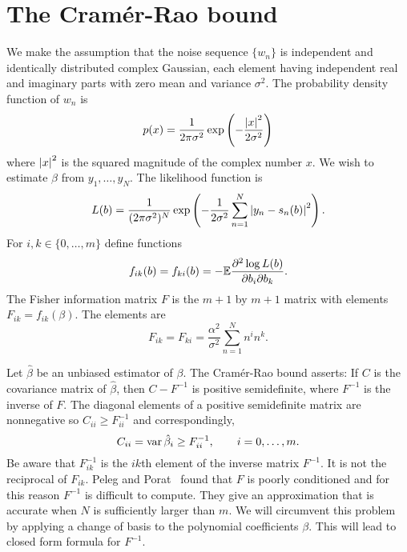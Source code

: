 \documentclass[journal,10pt]{IEEEtran}
\begin{document}
\section{The Cram\'{e}r-Rao bound} \label{sec_crb}

We make the assumption that the noise sequence $\{ w_n \}$ is independent and identically distributed complex Gaussian, each element having independent real and imaginary parts with zero mean and variance $\sigma^2$.  The probability density function of $w_n$ is 
\[
p(x) = \frac{1}{2 \pi \sigma^2} \exp\left( -\frac{{\left| x \right|}^2}{2\sigma^2} \right)
\]
where ${\left| x \right|}^2$ is the squared magnitude of the complex number $x$.  We wish to estimate $\beta$ from $y_1, \dots, y_N$.  The likelihood function is
\[
L(b) = \frac{1}{(2 \pi \sigma^2)^N} \exp\left( - \frac{1}{2\sigma^{2}} \sum_{n=1}^N {\left| y_n -  s_n(b)  \right|}^2 \right).
\]
For $i,k \in \{0, \dots, m\}$ define functions 
\[
f_{ik}(b) = f_{ki}(b) = -{\mathbb E} \frac{ \partial^2 \log L(b) }{ \partial b_{i} \partial b_{k}}.
\]  
The Fisher information matrix $F$ is the $m+1$ by $m+1$ matrix with elements $F_{i k} = f_{ik}(\beta)$.  The elements are
\[
F_{ik} = F_{ki} = \frac{\alpha^2}{\sigma^2}\sum_{n=1}^{N} n^{i}n^{k}.
\]

Let $\hat{\beta}$ be an unbiased estimator of $\beta$.  The Cram\'{e}r-Rao bound asserts:  If $C$ is the covariance matrix of $\hat{\beta}$, then $C - F^{-1}$ is positive semidefinite, where $F^{-1}$ is the inverse of $F$.  The diagonal elements of a positive semidefinite matrix are nonnegative so $C_{ii} \geq F^{-1}_{ii}$ and correspondingly, 
\[
C_{ii} = \operatorname{var} \hat{\beta}_{i} \geq F_{ii}^{-1}, \qquad i=0,\dots,m.
\]  
Be aware that $F_{ik}^{-1}$ is the $ik$th element of the inverse matrix $F^{-1}$.  It is not the reciprocal of $F_{ik}$.  Peleg and Porat~\cite{Peleg1991_CRB_PPS_1991} found that $F$ is poorly conditioned and for this reason $F^{-1}$ is difficult to compute.  They give an approximation that is accurate when $N$ is sufficiently larger than $m$.  We will circumvent this problem by applying a change of basis to the polynomial coefficients $\beta$.  This will lead to closed form formula for $F^{-1}$.  
\end{document}
